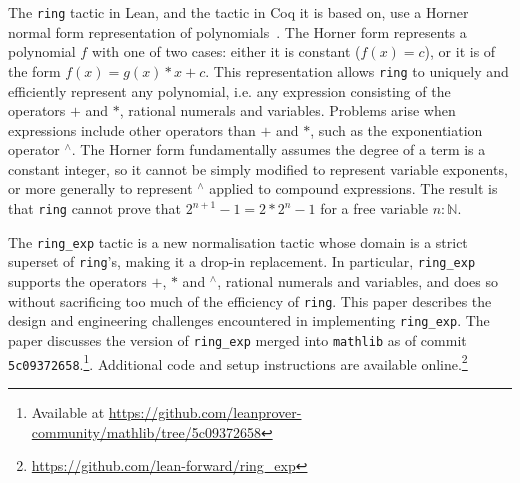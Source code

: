 \documentclass{llncs}
\newcommand{\Q}{\mathbb{Q}}
\newcommand{\lean}[1]{\texttt{#1}\xspace} %
\newcommand{\mathlib}{\texttt{mathlib}\xspace}
\newcommand{\pow}{{${}^\wedge$}\xspace}
\newcommand{\ring}{\lean{ring}}
\newcommand{\ringexp}{\lean{ring\_exp}}
\begin{document}
The \lean{ring} tactic in Lean, and the tactic in Coq it is based on,
use a Horner normal form representation of polynomials~\cite{ring-tactic}.
The Horner form represents a polynomial $f$ with one of two cases:
either it is constant ($f(x) = c$), or it is of the form $f(x) = g(x) * x + c$.
This representation
allows \lean{ring} to uniquely and efficiently represent any polynomial,
i.e. any expression consisting of the operators $+$ and $*$, rational numerals and variables.
Problems arise when expressions include other operators than $+$ and $*$, such as the exponentiation operator \pow.
The Horner form fundamentally assumes the degree of a term is a constant integer,
so it cannot be simply modified to represent variable exponents,
or more generally to represent \pow applied to compound expressions.
The result is that \ring cannot prove that $2^{n+1} - 1 = 2 * 2^n - 1$ for a free variable $n : \mathbb{N}$.


The \ringexp tactic is a new normalisation tactic whose domain is a strict superset of \lean{ring}'s,
making it a drop-in replacement. %
In particular, \ringexp supports the operators $+$, $*$ and \pow, rational numerals and variables,
and does so without sacrificing too much of the efficiency of \lean{ring}.
This paper describes the design and engineering challenges encountered in implementing \ringexp.
The paper discusses the version of \ringexp merged into \mathlib as of commit \texttt{5c09372658}.\footnote{Available at \url{https://github.com/leanprover-community/mathlib/tree/5c09372658}}.
Additional code and setup instructions are available online.\footnote{\url{https://github.com/lean-forward/ring_exp}}
\end{document}
